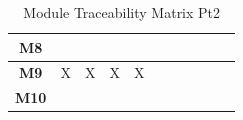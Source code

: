 \documentclass[12pt, titlepage]{article}
\begin{document}
\begin{table}[H]
\begin{tabular}{|c|c|c|c|c|c|c|c|c|c|c|}
    \textbf{M8}  &                     &                     &                     &                     &                       &                       &                       &                       &                       &                       \\ \hline
    \textbf{M9}  & X                   & X                   & X                   & X                   &                       &                       &                       &                       &                       &                       \\ \hline
    \textbf{M10} &                     &                     &                     &                     &                       &                       &                       &                       &                       &                       \\ \hline
  \end{tabular}
  \caption{Module Traceability Matrix Pt2}
  \label{Table:B_Mod_trace}
\end{table}
\end{document}
